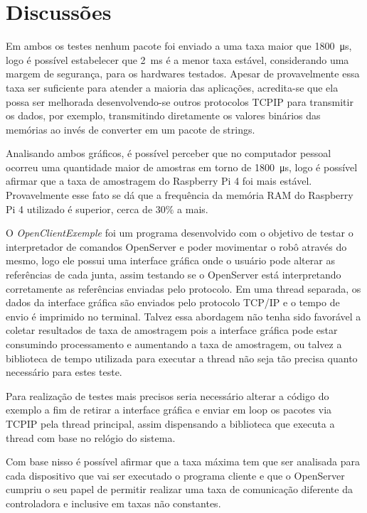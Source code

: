     \section{Discussões}
        
        Em ambos os testes nenhum pacote foi enviado a uma taxa maior que \SI{1800}{\micro\second}, logo é possível estabelecer que \SI{2}{\milli\second} é a menor taxa estável, considerando uma margem de segurança, para os hardwares testados. Apesar de provavelmente essa taxa ser suficiente para atender a maioria das aplicações, acredita-se que ela possa ser melhorada desenvolvendo-se outros protocolos \ac{TCPIP} para transmitir os dados, por exemplo, transmitindo diretamente os valores binários das memórias ao invés de converter em um pacote de strings.
        
        Analisando ambos gráficos, é possível perceber que no computador pessoal ocorreu uma quantidade maior de amostras em torno de \SI{1800}{\micro\second}, logo é possível afirmar que a taxa de amostragem do Raspberry Pi 4 foi mais estável. Provavelmente esse fato se dá que a frequência da memória RAM do Raspberry Pi 4 utilizado é superior, cerca de $30\%$ a mais.
        
        O \textit{OpenClientExemple} foi um programa desenvolvido com o objetivo de testar o interpretador de comandos OpenServer e poder movimentar o robô através do mesmo, logo ele possui uma interface gráfica onde o usuário pode alterar as referências de cada junta, assim testando se o OpenServer está interpretando corretamente as referências enviadas pelo protocolo. Em uma thread separada, os dados da interface gráfica são enviados pelo protocolo TCP/IP e o tempo de envio é imprimido no terminal. Talvez essa abordagem não tenha sido favorável a coletar resultados de taxa de amostragem pois a interface gráfica pode estar consumindo processamento e aumentando a taxa de amostragem, ou talvez a biblioteca de tempo utilizada para executar a thread não seja tão precisa quanto necessário para estes teste.
        
        Para realização de testes mais precisos seria necessário alterar a código do exemplo a fim de retirar a interface gráfica e enviar em loop os pacotes via \ac{TCPIP} pela thread principal, assim dispensando a biblioteca que executa a thread com base no relógio do sistema.
        
        Com base nisso é possível afirmar que a taxa máxima tem que ser analisada para cada dispositivo que vai ser executado o programa cliente e que o OpenServer cumpriu o seu papel de permitir realizar uma taxa de comunicação diferente da controladora e inclusive em taxas não constantes.